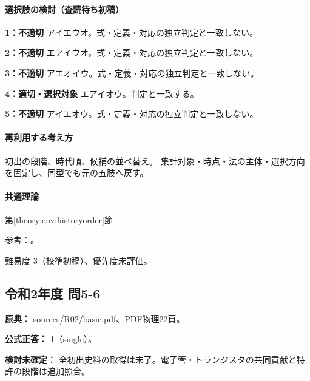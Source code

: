 \paragraph{選択肢の検討（査読待ち初稿）}\mbox{}\par

\noindent\textbf{1：不適切} アイエウオ。式・定義・対応の独立判定と一致しない。\par

\noindent\textbf{2：不適切} エアイウオ。式・定義・対応の独立判定と一致しない。\par

\noindent\textbf{3：不適切} アエオイウ。式・定義・対応の独立判定と一致しない。\par

\noindent\textbf{4：適切・選択対象} エアイオウ。判定と一致する。\par

\noindent\textbf{5：不適切} アイエオウ。式・定義・対応の独立判定と一致しない。\par

\paragraph{再利用する考え方} 初出の段階、時代順、候補の並べ替え。 集計対象・時点・法の主体・選択方向を固定し、同型でも元の五肢へ戻す。

\paragraph{共通理論} \hyperref[theory:env:historyorder]{第\ref*{theory:env:historyorder}節}

\par 参考：\cite{env58_steam}。

\par 難易度 3（校準初稿）、優先度未評価。

\subsection{令和2年度 問5-6}
\label{q:r02-reg-basic-5-6}

\noindent\textbf{原典：} sources/R02/basic.pdf、PDF物理22頁。

\textbf{公式正答：} 1（single）。

\par\textbf{検討未確定：} 全初出史料の取得は未了。電子管・トランジスタの共同貢献と特許の段階は追加照合。

